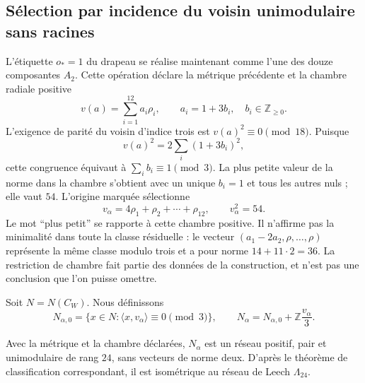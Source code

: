 \subsection{Sélection par incidence du voisin unimodulaire sans racines}
\label{exc:leech}

L'étiquette $o_*=1$ du drapeau se réalise maintenant comme l'une des
douze composantes $A_2$. Cette opération déclare la métrique précédente et
la chambre radiale positive
\[
 v(a)=\sum_{i=1}^{12}a_i\rho_i,
 \qquad a_i=1+3b_i,\quad b_i\in\mathbb Z_{\geq0}.
\]
L'exigence de parité du voisin d'indice trois est $v(a)^2\equiv0\pmod{18}$. Puisque
\[
 v(a)^2=2\sum_i(1+3b_i)^2,
\]
cette congruence équivaut à $\sum_i b_i\equiv1\pmod3$. La plus petite
valeur de la norme dans la chambre s'obtient avec un unique $b_i=1$ et
tous les autres nuls ; elle vaut $54$. L'origine marquée sélectionne
\begin{equation}
 v_\alpha=4\rho_1+\rho_2+\cdots+\rho_{12},
 \qquad v_\alpha^2=54.
 \label{exc:vector}
\end{equation}
Le mot ``plus petit'' se rapporte à cette chambre positive. Il n'affirme pas la minimalité dans toute la classe résiduelle : le vecteur $(a_1-2a_2,\rho,\ldots,\rho)$ représente la même classe modulo trois et a pour norme $14+11\cdot2=36$. La restriction de chambre fait partie des données de la construction, et n'est pas une conclusion que l'on puisse omettre.

Soit $N=N(C_W)$. Nous définissons
\begin{equation}
 N_{\alpha,0}=\{x\in N:\langle x,v_\alpha\rangle\equiv0\pmod3\},
 \qquad
 N_\alpha=N_{\alpha,0}+\mathbb Z\frac{v_\alpha}{3}.
 \label{exc:vecino}
\end{equation}

\begin{theorem}
\label{exc:teorema-leech}
Avec la métrique et la chambre déclarées, $N_\alpha$ est un réseau
positif, pair et unimodulaire de rang $24$, sans vecteurs de norme deux.
D'après le théorème de classification correspondant, il est isométrique au
réseau de Leech $\Lambda_{24}$.
\end{theorem}

